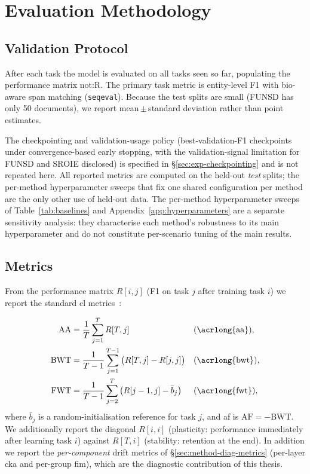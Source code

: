 \section{Evaluation Methodology}
\label{sec:exp-eval}

\subsection{Validation Protocol}
\label{sec:eval-protocol}

After each task the model is evaluated on all tasks seen so far, populating the
performance matrix \gls{not:R}. The primary task metric is entity-level F1 with
\gls{bio}-aware span matching (\texttt{seqeval}). Because the test splits are small
(FUNSD has only 50 documents), we report mean\,$\pm$\,standard deviation rather than
point estimates.

The checkpointing and validation-usage policy (best-validation-F1 checkpoints
under convergence-based early stopping, with the validation-signal limitation for
FUNSD and SROIE disclosed) is specified in \S\ref{sec:exp-checkpointing} and is not
repeated here. All reported metrics are computed on the held-out \emph{test} splits;
the per-method hyperparameter sweeps that fix one shared configuration per method are
the only other use of held-out data. The per-method hyperparameter sweeps of Table~\ref{tab:baselines} and
Appendix~\ref{app:hyperparameters} are a separate sensitivity analysis: they
characterise each method's robustness to its main hyperparameter and do not
constitute per-scenario tuning of the main results.

\subsection{Metrics}
\label{sec:eval-metrics}

From the performance matrix $R[i,j]$ (F1 on task $j$ after training task $i$) we
report the standard \gls{cl} metrics~\citep{lopezpaz2017gem}:

\begin{align}
  \mathrm{AA}  &= \frac{1}{T}\sum_{j=1}^{T} R[T,j] && \text{(\acrlong{aa})},\\
  \mathrm{BWT} &= \frac{1}{T-1}\sum_{j=1}^{T-1}\big(R[T,j]-R[j,j]\big) && \text{(\acrlong{bwt})},\\
  \mathrm{FWT} &= \frac{1}{T-1}\sum_{j=2}^{T}\big(R[j-1,j]-\bar{b}_j\big) && \text{(\acrlong{fwt})},
\end{align}
where $\bar{b}_j$ is a random-initialisation reference for task $j$, and
\acrlong{af} is $\mathrm{AF}=-\mathrm{BWT}$. We additionally report the diagonal $R[i,i]$
(plasticity: performance immediately after learning task $i$) against $R[T,i]$
(stability: retention at the end). In addition we report the \emph{per-component}
drift metrics of \S\ref{sec:method-diag-metrics} (per-layer \gls{cka} and per-group
\gls{fim}), which are the diagnostic contribution of this thesis.

